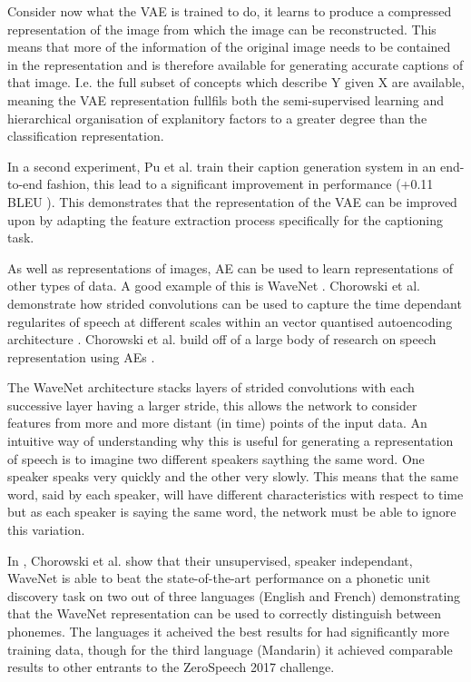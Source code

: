 Consider now what the \ac{VAE} is trained to do, it learns to produce a compressed representation of the image from which the image can be reconstructed. This means that more of the information of the original image needs to be contained in the representation and is therefore available for generating accurate captions of that image. I.e. the full subset of concepts which describe Y given X are available, meaning the \ac{VAE} representation fullfils both the semi-supervised learning and hierarchical organisation of explanitory factors to a greater degree than the classification representation.

In a second experiment, Pu et al. train their caption generation system in an end-to-end fashion, this lead to a significant improvement in performance (+0.11 BLEU \cite{bleu}). This demonstrates that the representation of the \ac{VAE} can be improved upon by adapting the feature extraction process specifically for the captioning task.


As well as representations of images, \ac{AE} can be used to learn representations of other types of data. A good example of this is WaveNet \cite{wavenet}. Chorowski et al. demonstrate how strided convolutions \cite{radford2015unsupervised} can be used to capture the time dependant regularites of speech at different scales within an vector quantised autoencoding architecture \cite{van2017neural}. Chorowski et al. build off of a large body of research on speech representation using \acp{AE} \cite{vincent2010stacked, lu2013speech}.

The WaveNet architecture stacks layers of strided convolutions with each successive layer having a larger stride, this allows the network to consider features from more and more distant (in time) points of the input data. An intuitive way of understanding why this is useful for generating a representation of speech is to imagine two different speakers saything the same word. One speaker speaks very quickly and the other very slowly. This means that the same word, said by each speaker, will have different characteristics with respect to time but as each speaker is saying the same word, the network must be able to ignore this variation.

In \cite{wavenet}, Chorowski et al. show that their unsupervised, speaker independant, WaveNet is able to beat the state-of-the-art performance on a phonetic unit discovery task \cite{dunbar2017zero} on two out of three languages (English and French) demonstrating that the WaveNet representation can be used to correctly distinguish between phonemes. The languages it acheived the best results for had significantly more training data, though for the third language (Mandarin) it achieved comparable results to other entrants to the ZeroSpeech 2017 challenge. 

